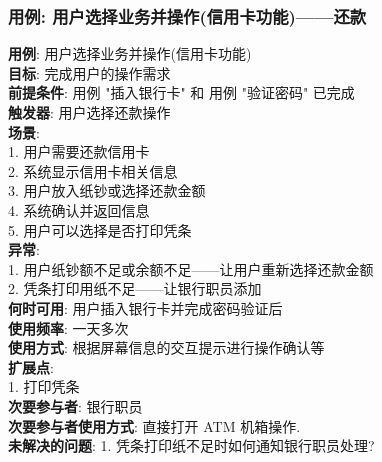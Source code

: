 \documentclass[UTF8]{article}
\begin{document}
\subsubsection{用例: 用户选择业务并操作(信用卡功能)——还款}
\noindent
\textbf{用例}: 用户选择业务并操作(信用卡功能)
\\
\textbf{目标}: 完成用户的操作需求
\\
\textbf{前提条件}: 用例 "插入银行卡" 和 用例 "验证密码" 已完成
\\
\textbf{触发器}: 用户选择还款操作
\\
\textbf{场景}: \\
	\hspace*{2em} 1. 用户需要还款信用卡 \\
	\hspace*{2em} 2. 系统显示信用卡相关信息 \\
	\hspace*{2em} 3. 用户放入纸钞或选择还款金额 \\
	\hspace*{2em} 4. 系统确认并返回信息 \\
	\hspace*{2em} 5. 用户可以选择是否打印凭条 \\
	
\textbf{异常}: \\
	\hspace*{2em} 1. 用户纸钞额不足或余额不足——让用户重新选择还款金额 \\
	\hspace*{2em} 2. 凭条打印用纸不足——让银行职员添加 \\
\textbf{何时可用}: 用户插入银行卡并完成密码验证后
\\
\textbf{使用频率}: 一天多次
\\
\textbf{使用方式}: 根据屏幕信息的交互提示进行操作确认等 \\
\textbf{扩展点}: \\
	\hspace*{2em}1. 打印凭条 \\
\textbf{次要参与者}: 银行职员
\\
\textbf{次要参与者使用方式}: 直接打开 ATM 机箱操作.
\\
\textbf{未解决的问题}: 
	\hspace*{2em} 1. 凭条打印纸不足时如何通知银行职员处理? \\
			
			
\end{document}
